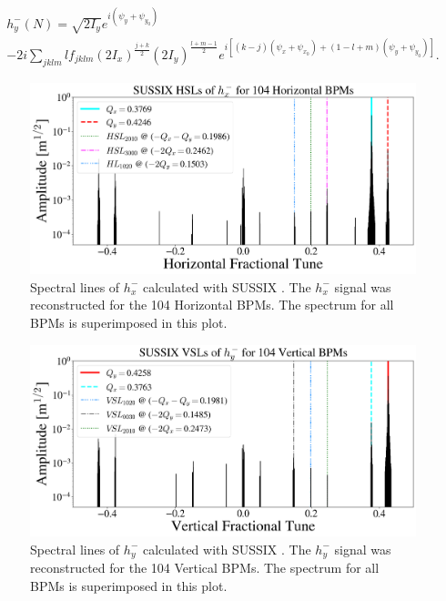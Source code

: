 \begin{multline}
    \label{eq:hypsi2}
    h_y^{-}(N)=\sqrt{2I_y}e^{i\left( \psi_y+\psi_{y_0}\right)} \\
    -2i \sum_{jklm} l f_{jklm} \left( 2I_x \right)^{\frac{j+k}{2}}\left( 2I_y \right)^{\frac{l+m-1}{2}}
    e^{i \left[ \left( k-j\right)\left( \psi_x + \psi_{x_0} \right) +\left( 1-l+m\right)\left( \psi_y + \psi_{y_0} \right)\right]}.
\end{multline}

\begin{figure}[H]
    \centering
    \includegraphics[width=\columnwidth]{chapter4/hxspect.png}
    \caption{Spectral lines of $h_x^{-}$ calculated with SUSSIX \cite{sussix}. The $h_x^{-}$ signal was reconstructed for the 104 Horizontal BPMs. The spectrum for all BPMs is superimposed in this plot.}
    \label{fig:hxspect1}
\end{figure}

\begin{figure}[H]
    \centering
    \includegraphics[width=\columnwidth]{chapter4/hyspect.png}
    \caption{Spectral lines of $h_y^{-}$ calculated with SUSSIX \cite{sussix}. The $h_y^{-}$ signal was reconstructed for the 104 Vertical BPMs. The spectrum for all BPMs is superimposed in this plot.}
    \label{fig:hyspect1}
\end{figure}

